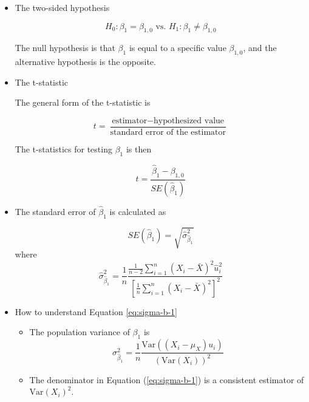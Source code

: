 \documentclass[a4paper,11pt]{article}
\newcommand{\var}{\mathrm{Var}}
\begin{document}
\begin{itemize}
\item The two-sided hypothesis
\label{sec:orgde1b20e}

\[ H_0: \beta_1 = \beta_{1,0} \text{ vs. } H_1: \beta_1 \neq \beta_{1,0} \]

The null hypothesis is that \(\beta_1\) is equal to a specific value
\(\beta_{1,0}\), and the alternative hypothesis is the opposite. 

\item The t-statistic
\label{sec:org1608193}

The general form of the t-statistic is

\begin{equation}
\label{eq:general-t}
t = \frac{\text{estimator} - \text{hypothesized value}}{\text{standard error of the estimator}}
\end{equation}

The t-statistics for testing \(\beta_1\) is then

\begin{equation}
\label{eq:t-stat-b1}
t = \frac{\hat{\beta}_1 - \beta_{1,0}}{SE(\hat{\beta}_1)}
\end{equation}

\item The standard error of \(\hat{\beta}_1\) is calculated as
\label{sec:org70395e6}

\begin{equation}
\label{eq:se-b-1}
SE(\hat{\beta}_1) = \sqrt{\hat{\sigma}^2_{\hat{\beta}_1}}
\end{equation}
where
\begin{equation}
\label{eq:sigma-b-1}
\hat{\sigma}^2_{\hat{\beta}_1} = \frac{1}{n} \frac{\frac{1}{n-2} \sum_{i=1}^n (X_i - \bar{X})^2 \hat{u}^2_i}{\left[ \frac{1}{n} \sum_{i=1}^n (X_i - \bar{X})^2 \right]^2}
\end{equation}

\item How to understand Equation \ref{eq:sigma-b-1}
\label{sec:orge67c814}

\begin{itemize}
\item The population variance of \(\beta_1\) is 
\[ \sigma^2_{\hat{\beta}_1} = \frac{1}{n} \frac{\var\left( (X_i - \mu_X)u_i \right)}{\left( \var(X_i) \right)^2} \]

\item The denominator in Equation (\ref{eq:sigma-b-1}) is a consistent
estimator of \(\var(X_i)^2\).


\end{itemize}
\end{itemize}
\end{document}
